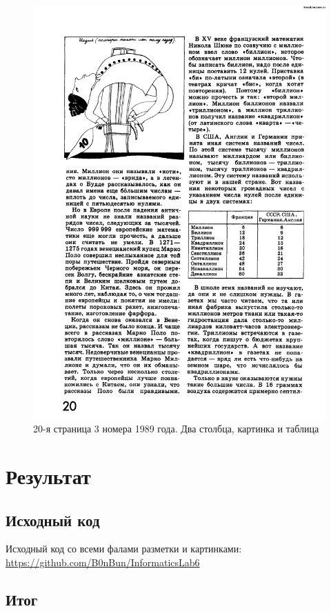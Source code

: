 \begin{figure}[!htb]
\begin{minipage}{0.48\textwidth}
     \includegraphics[width=.9\linewidth]{kvant_89_03-20.png}
     \caption{\footnotesize{20-я страница 3 номера 1989 года. Два столбца, картинка и таблица}}\label{fig:kvant-88-page}
   \end{minipage}
\end{figure}

\newpage

\section{Результат}

\subsection{Исходный код}

Исходный код со всеми фалами разметки и картинками: \newline
\url{https://github.com/B0nBun/InformaticsLab6}

\subsection{Итог}

